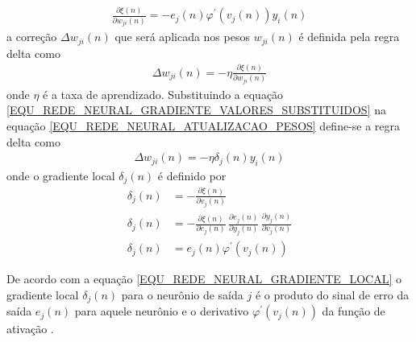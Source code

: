 \begin{align}
\frac{\partial \xi(n)}{\partial w_{ji}(n)} =
-e_{j}(n)\varphi^{'}(v_{j}(n))y_{i}(n)
\label{EQU_REDE_NEURAL_GRADIENTE_VALORES_SUBSTITUIDOS}
\end{align}
a correção \(\Delta w_{ji}(n)\) que será aplicada nos pesos \(w_{ji}(n)\) é definida pela regra delta como
\begin{align}
\Delta w_{ji}(n) = - \eta \frac{\partial \xi(n)}{\partial w_{ji}(n)}
\label{EQU_REDE_NEURAL_ATUALIZACAO_PESOS}
\end{align}
onde \(\eta\) é a taxa de aprendizado. Substituindo a equação \eqref{EQU_REDE_NEURAL_GRADIENTE_VALORES_SUBSTITUIDOS} na equação \eqref{EQU_REDE_NEURAL_ATUALIZACAO_PESOS} define-se a regra delta como
\begin{align}
\Delta w_{ji}(n) = - \eta \delta_{j}(n)y_{i}(n)
\label{EQU_REDE_NEURAL_ATUALIZACAO_PESOS_COM_GRADIENTE_LOCAL}
\end{align}
onde o gradiente local \(\delta_{j}(n)\) é definido por
\begin{align}
\nonumber \delta_{j}(n) &= -\frac{\partial \xi(n)}{\partial v_{j}(n)} \\ 
 	      \delta_{j}(n) &= -\frac{\partial \xi(n)}{\partial e_{j}(n)} \, \frac{\partial e_{j}(n)}{\partial y_{j}(n)} \, \frac{\partial y_{j}(n)}{\partial v_{j}(n)}\label{EQU_REDE_NEURAL_GRADIENTE_LOCAL_ATUALIZACOES}\\
	      \delta_{j}(n) &= e_{j}(n)\varphi^{'}(v_{j}(n))
\label{EQU_REDE_NEURAL_GRADIENTE_LOCAL}
\end{align}

De acordo com a equação \eqref{EQU_REDE_NEURAL_GRADIENTE_LOCAL} o gradiente local \(\delta_{j}(n)\) para o neurônio de saída \(j\) é o produto do sinal de erro da saída \(e_{j}(n)\) para aquele neurônio e o derivativo \(\varphi^{'}(v_{j}(n))\) da função de ativação \cite{Haykin2007}.

